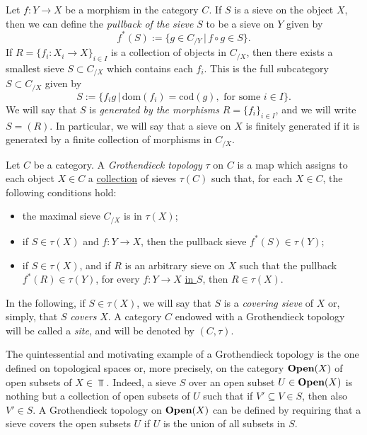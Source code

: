 Let $f: Y\to X$ be a morphism in the category $C$. If $S$ is a sieve on the object $X$, then we can define the \textit{pullback of the sieve} $S$ to be a sieve on $Y$ given by 
\begin{equation*}
	f^*(S):=\{g\in C_{/Y} \,| \, f\circ g\in S\}.
\end{equation*}
If $R=\{f_i:X_i\to X\}_{i\in I}$ is a collection of objects in $C_{/X}$, then there exists a smallest sieve $S\subset C_{/X}$ which contains each $f_i$. This is the full subcategory $S\subset C_{/X}$ given by
\begin{equation*}
	S:=\{f_ig \, |\, \mbox{dom}(f_i)=\mbox{cod}(g),\mbox{ for some }i\in I\}.
\end{equation*} 
We will say that $S$ is \textit{generated by the morphisms} $R=\{f_i\}_{i\in I}$, and we will write $S=(R)$. In particular, we will say that a sieve on $X$ is finitely generated if it is generated by a finite collection of morphisms in $C_{/X}$.
\begin{defi}\label{GTop}
	Let $C$ be a category. A \textit{Grothendieck topology} $\tau$ on $C$ is a map which assigns to each object $X\in C$ a \underline{collection} of sieves $\tau(C)$ such that, for each $X\in C$, the following conditions hold:
	\begin{itemize}[nosep]
		\item[(a)] the maximal sieve $C_{/X}$ is in $\tau(X)$;
		\item[(b)] if $S\in \tau(X)$ and $f:Y\to X$, then the pullback sieve $f^*(S)\in \tau(Y)$;
		\item[(c)] if $S\in \tau(X)$, and if $R$ is an arbitrary sieve on $X$ such that the pullback $f^*(R)\in \tau(Y)$, for every $f:Y\to X$ \underline{in $S$}, then $R\in \tau(X)$.
	\end{itemize} 
\end{defi}
In the following, if $S\in \tau(X)$, we will say that $S$ is a \textit{covering sieve} of $X$ or, simply, that $S$ \textit{covers} $X$. A category $C$ endowed with a Grothendieck topology will be called a \textit{site}, and will be denoted by $(C,\tau)$.
\begin{ex}\label{ExampleGrothOpenSub}
	The quintessential and motivating example of a Grothendieck topology is the one defined on topological spaces or, more precisely, on the category ${\normalfont\textbf{Open}}(X)$ of open subsets of $X\in \Top$. Indeed, a sieve $S$ over an open subset $U\in{\normalfont\textbf{Open}}(X)$ is nothing but a collection of open subsets of $U$ such that if $V'\subseteq V\in S$, then also $V'\in S$. A Grothendieck topology on ${\normalfont\textbf{Open}}(X)$ can be defined by requiring that a sieve covers the open subsets $U$ if $U$ is the union of all subsets in $S$.
\end{ex}
